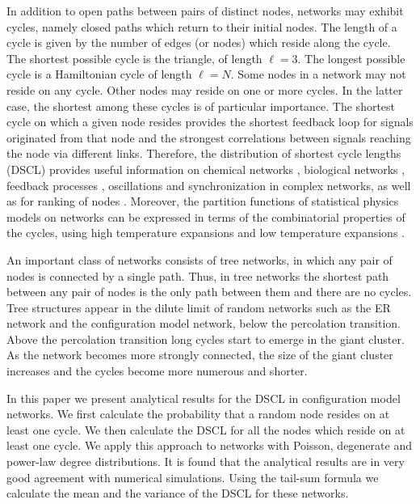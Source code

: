 \documentclass[preprint,pre,superscriptaddress,showpacs]{revtex4}
\begin{document}
In addition to open paths between pairs of distinct nodes, 
networks may exhibit cycles, namely closed paths which return to their initial nodes.
The length of a cycle is given by the number of edges (or nodes) which reside
along the cycle. The shortest possible cycle is the triangle, of length $\ell=3$. 
The longest possible cycle is a Hamiltonian cycle of length $\ell=N$.
Some nodes in a network may not reside on any cycle.
Other nodes may reside on one or more cycles.
In the latter case, the shortest among these cycles is
of particular importance.
The shortest cycle on which a given node resides provides the shortest
feedback loop for signals originated from that node
and the strongest correlations between signals 
reaching the node via different links.
Therefore, the distribution of shortest cycle lengths (DSCL)
provides useful information on
chemical networks
\cite{Gleiss2001},
biological networks
\cite{Klamt2009},
feedback processes
\cite{Zanudo2017}, 
oscillations
\cite{Vladimirov2012,Goldental2015,Goldental2017}
and synchronization
\cite{Barrat2012}
in complex networks, as well as for
ranking of nodes
\cite{Kerrebroeck2008,Giscard2017}.
Moreover, the partition functions of statistical physics models
on networks can be expressed in terms of the combinatorial 
properties of the cycles, using high temperature expansions
and low temperature expansions
\cite{Yeomans1992}.

An important class of networks consists of tree networks, 
in which any pair of nodes is connected by a single path.
Thus, in tree networks the shortest path between any pair of
nodes is the only path between them and there are no cycles.
Tree structures appear in the dilute limit of random networks 
such as the ER network and the configuration model network,
below the percolation transition.
Above the percolation transition long cycles start to emerge
in the giant cluster. 
As the network becomes more strongly connected,
the size of the giant cluster increases and
the cycles become more numerous and shorter.

In this paper we present analytical results for the DSCL in
configuration model networks.
We first calculate the probability that a random node resides
on at least one cycle.
We then calculate the DSCL for all the nodes which reside
on at least one cycle.
We apply this approach to networks with Poisson,
degenerate and power-law degree distributions. 
It is found that the analytical results are in very good agreement
with numerical simulations.
Using the tail-sum formula we calculate the mean and the variance
of the DSCL for these networks. 
\end{document}
